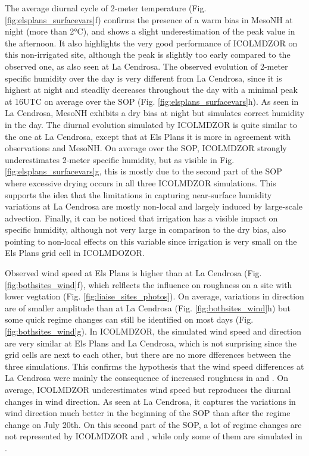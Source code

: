 The average diurnal cycle of 2-meter temperature (Fig. \ref{fig:elsplans_surfacevars}f) confirms the presence of a warm bias in MesoNH at night (more than 2°C), and shows a slight underestimation of the peak value in the afternoon. 
It also highlights the very good performance of ICOLMDZOR on this non-irrigated site, although the peak is slightly too early compared to the observed one, as also seen at La Cendrosa.
The observed evolution of 2-meter specific humidity over the day is very different from La Cendrosa, since it is highest at night and steadliy decreases throughout the day with a minimal peak at 16UTC on average over the SOP (Fig. \ref{fig:elsplans_surfacevars}h).
As seen in La Cendrosa, MesoNH exhibits a dry bias at night but simulates correct humidity in the day. 
The diurnal evolution simulated by ICOLMDZOR is quite similar to the one at La Cendrosa, except that at Els Plans it is more in agreement with observations and MesoNH. On average over the SOP, ICOLMDZOR strongly underestimates 2-meter specific humidity, but as visible in Fig. \ref{fig:elsplans_surfacevars}g, this is mostly due to the second part of the SOP where excessive drying occurs in all three ICOLMDZOR simulations. 
This supports the idea that the limitations in capturing near-surface humidity variations at La Cendrosa are mostly non-local and largely induced by large-scale advection. 
Finally, it can be noticed that irrigation has a visible impact on specific humidity, although not very large in comparison to the dry bias, also pointing to non-local effects on this variable since irrigation is very small on the Els Plans grid cell in ICOLMDOZOR.%

Observed wind speed at Els Plans is higher than at La Cendrosa (Fig. \ref{fig:bothsites_wind}f), which relflects the influence on roughness on a site with lower vegtation (Fig. \ref{fig:liaise_sites_photos}). On average, variations in direction are of smaller amplitude than at La Cendrosa (Fig. \ref{fig:bothsites_wind}h) but some quick regime changes can still be identified on most days (Fig. \ref{fig:bothsites_wind}g).
In ICOLMDZOR, the simulated wind speed and direction are very similar at Els Plans and La Cendrosa, which is not surprising since the grid cells are next to each other, but there are no more dfferences between the three simulations. This confirms the hypothesis that the wind speed differences at La Cendrosa were mainly the consequence of increased roughness in \irrboost and \irr. On average, ICOLMDZOR underestimates wind speed but reproduces the diurnal changes in wind direction. As seen at La Cendrosa, it captures the variations in wind direction much better in the beginning of the SOP than after the regime change on July 20th. On this second part of the SOP, a lot of regime changes are not represented by ICOLMDZOR and \mesomean, while only some of them are simulated in \mesoexact.

